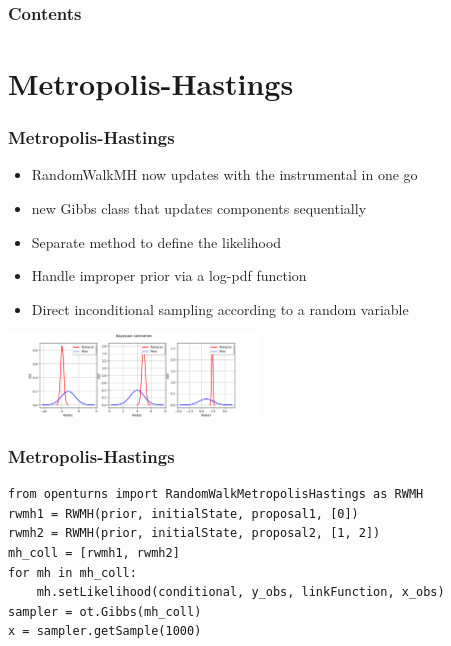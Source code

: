 \documentclass{beamer}
\begin{document}



\begin{frame}
\frametitle{Contents}
\tableofcontents
\end{frame}

\section{Metropolis-Hastings}
% 
\begin{frame}[containsverbatim]
\frametitle{Metropolis-Hastings}

\begin{itemize}
\item RandomWalkMH now updates with the instrumental in one go
\item new Gibbs class that updates components sequentially
\item Separate method to define the likelihood
\item Handle improper prior via a log-pdf function
\item Direct inconditional sampling according to a random variable
\end{itemize}

 
\begin{center}
\includegraphics[width=0.5\textwidth]{figures/sphx_glr_plot_bayesian_calibration_002.png}
\end{center}
\end{frame}

\begin{frame}[containsverbatim]
\frametitle{Metropolis-Hastings}

\lstset{language=python}
\begin{lstlisting}
from openturns import RandomWalkMetropolisHastings as RWMH
rwmh1 = RWMH(prior, initialState, proposal1, [0])
rwmh2 = RWMH(prior, initialState, proposal2, [1, 2])
mh_coll = [rwmh1, rwmh2]
for mh in mh_coll:
    mh.setLikelihood(conditional, y_obs, linkFunction, x_obs)
sampler = ot.Gibbs(mh_coll)
x = sampler.getSample(1000)
\end{lstlisting}


\end{frame}
\end{document}
